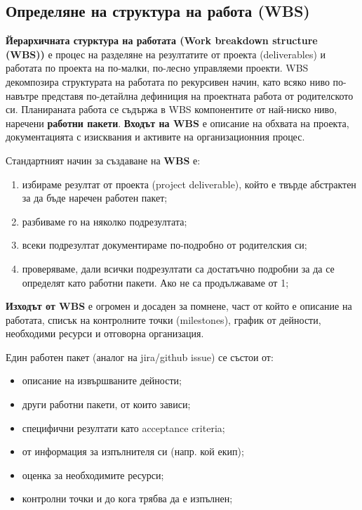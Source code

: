 \documentclass[fleqn,12pt]{article}
\begin{document}
\subsection{Определяне на структура на работа (WBS)}

\textbf{Йерархичната стурктура на работата (Work breakdown structure (WBS))} е процес на разделяне на резултатите от проекта (deliverables) и работата по проекта на по-малки, по-лесно управляеми проекти.
WBS декомпозира структурата на работата по рекурсивен начин, като всяко ниво по-навътре представя по-детайлна дефиниция на проектната работа от родителското си.
Планираната работа се съдържа в WBS компонентите от най-ниско ниво, наречени \textbf{работни пакети}.
\bigbreak
\textbf{Входът на WBS} е описание на обхвата на проекта, документацията с изисквания и активите на организационния процес.
\bigbreak

Стандартният начин за създаване на \textbf{WBS} е:
\begin{enumerate}
    \item избираме резултат от проекта (project deliverable), който е твърде абстрактен за да бъде наречен работен пакет;
    \item разбиваме го на няколко подрезултата;
    \item всеки подрезултат документираме по-подробно от родителския си;
    \item проверяваме, дали всички подрезултати са достатъчно подробни за да се определят като работни пакети. Ако не са продължаваме от 1;
\end{enumerate}

\textbf{Изходът от WBS} е огромен и досаден за помнене, част от който е описание на работата, списък на контролните точки (milestones), график от дейности, необходими ресурси и отговорна организация.
\bigbreak

Един работен пакет (аналог на jira/github issue) се състои от:
\begin{itemize}
    \item описание на извършваните дейности;
    \item други работни пакети, от които зависи;
    \item специфични резултати като acceptance criteria;
    \item от информация за изпълнителя си (напр. кой екип);
    \item оценка за необходимите ресурси;
    \item контролни точки и до кога трябва да е изпълнен;
\end{itemize}
\bigbreak
\end{document}
